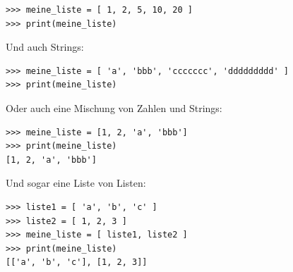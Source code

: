\begin{Verbatim}[frame=single]
>>> meine_liste = [ 1, 2, 5, 10, 20 ]
>>> print(meine_liste)
\end{Verbatim}

\noindent
Und auch Strings:

\begin{Verbatim}[frame=single]
>>> meine_liste = [ 'a', 'bbb', 'ccccccc', 'ddddddddd' ]
>>> print(meine_liste)
\end{Verbatim}

\noindent
Oder auch eine Mischung von Zahlen und Strings:

\begin{Verbatim}[frame=single]
>>> meine_liste = [1, 2, 'a', 'bbb']
>>> print(meine_liste)
[1, 2, 'a', 'bbb']
\end{Verbatim}

\noindent
Und sogar eine Liste von Listen:

\begin{Verbatim}[frame=single]
>>> liste1 = [ 'a', 'b', 'c' ]
>>> liste2 = [ 1, 2, 3 ]
>>> meine_liste = [ liste1, liste2 ]
>>> print(meine_liste)
[['a', 'b', 'c'], [1, 2, 3]]
\end{Verbatim}


